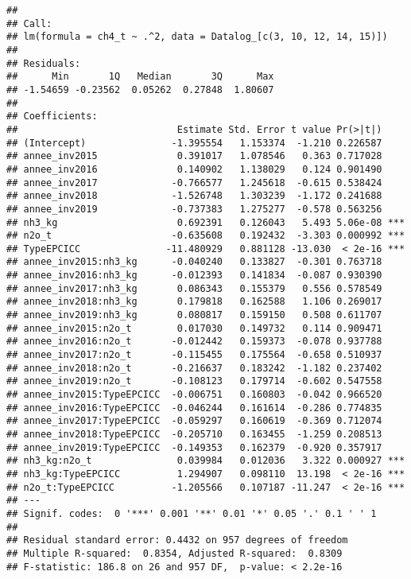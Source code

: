 \documentclass[
]{article}
\begin{document}
\begin{verbatim}
## 
## Call:
## lm(formula = ch4_t ~ .^2, data = Datalog_[c(3, 10, 12, 14, 15)])
## 
## Residuals:
##      Min       1Q   Median       3Q      Max 
## -1.54659 -0.23562  0.05262  0.27848  1.80607 
## 
## Coefficients:
##                            Estimate Std. Error t value Pr(>|t|)    
## (Intercept)               -1.395554   1.153374  -1.210 0.226587    
## annee_inv2015              0.391017   1.078546   0.363 0.717028    
## annee_inv2016              0.140902   1.138029   0.124 0.901490    
## annee_inv2017             -0.766577   1.245618  -0.615 0.538424    
## annee_inv2018             -1.526748   1.303239  -1.172 0.241688    
## annee_inv2019             -0.737383   1.275277  -0.578 0.563256    
## nh3_kg                     0.692391   0.126043   5.493 5.06e-08 ***
## n2o_t                     -0.635608   0.192432  -3.303 0.000992 ***
## TypeEPCICC               -11.480929   0.881128 -13.030  < 2e-16 ***
## annee_inv2015:nh3_kg      -0.040240   0.133827  -0.301 0.763718    
## annee_inv2016:nh3_kg      -0.012393   0.141834  -0.087 0.930390    
## annee_inv2017:nh3_kg       0.086343   0.155379   0.556 0.578549    
## annee_inv2018:nh3_kg       0.179818   0.162588   1.106 0.269017    
## annee_inv2019:nh3_kg       0.080817   0.159150   0.508 0.611707    
## annee_inv2015:n2o_t        0.017030   0.149732   0.114 0.909471    
## annee_inv2016:n2o_t       -0.012442   0.159373  -0.078 0.937788    
## annee_inv2017:n2o_t       -0.115455   0.175564  -0.658 0.510937    
## annee_inv2018:n2o_t       -0.216637   0.183242  -1.182 0.237402    
## annee_inv2019:n2o_t       -0.108123   0.179714  -0.602 0.547558    
## annee_inv2015:TypeEPCICC  -0.006751   0.160803  -0.042 0.966520    
## annee_inv2016:TypeEPCICC  -0.046244   0.161614  -0.286 0.774835    
## annee_inv2017:TypeEPCICC  -0.059297   0.160619  -0.369 0.712074    
## annee_inv2018:TypeEPCICC  -0.205710   0.163455  -1.259 0.208513    
## annee_inv2019:TypeEPCICC  -0.149353   0.162379  -0.920 0.357917    
## nh3_kg:n2o_t               0.039984   0.012036   3.322 0.000927 ***
## nh3_kg:TypeEPCICC          1.294907   0.098110  13.198  < 2e-16 ***
## n2o_t:TypeEPCICC          -1.205566   0.107187 -11.247  < 2e-16 ***
## ---
## Signif. codes:  0 '***' 0.001 '**' 0.01 '*' 0.05 '.' 0.1 ' ' 1
## 
## Residual standard error: 0.4432 on 957 degrees of freedom
## Multiple R-squared:  0.8354, Adjusted R-squared:  0.8309 
## F-statistic: 186.8 on 26 and 957 DF,  p-value: < 2.2e-16
\end{verbatim}
\end{document}
